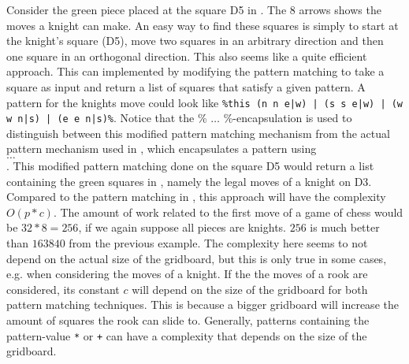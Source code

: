 Consider the green piece placed at the square D5 in . The 8 arrows shows the moves a knight can make. An easy way to find these squares is simply to start at the knight's square (D5), move two squares in an arbitrary direction and then one square in an orthogonal direction. This also seems like a quite efficient approach. This can implemented by modifying the pattern matching to take a square as input and return a list of squares that satisfy a given pattern. A pattern for the knights move could look like \texttt{\%this (n n e|w) | (s s e|w) | (w w n|s) | (e e n|s)\%}. Notice that the \% $\ldots$ \%-encapsulation is used to distinguish between this modified pattern matching mechanism from the actual pattern mechanism used in \productname{}, which encapsulates a pattern using \\ $\ldots$ \\. This modified pattern matching done on the square D5 would return a list containing the green squares in , namely the legal moves of a knight on D3.
Compared to the pattern matching in \productname{}, this approach will have the complexity $O(p * c)$. The amount of work related to the first move of a game of chess would be $32 * 8 = 256$, if we again suppose all pieces are knights. $256$ is much better than $163840$ from the previous example. The complexity here seems to not depend on the actual size of the gridboard, but this is only true in some cases, e.g. when considering the moves of a knight. If the the moves of a rook are considered, its constant $c$ will depend on the size of the gridboard for both pattern matching techniques. This is because a bigger gridboard will increase the amount of squares the rook can slide to. Generally, patterns containing the pattern-value \texttt{*} or \texttt{+} can have a complexity that depends on the size of the gridboard.

